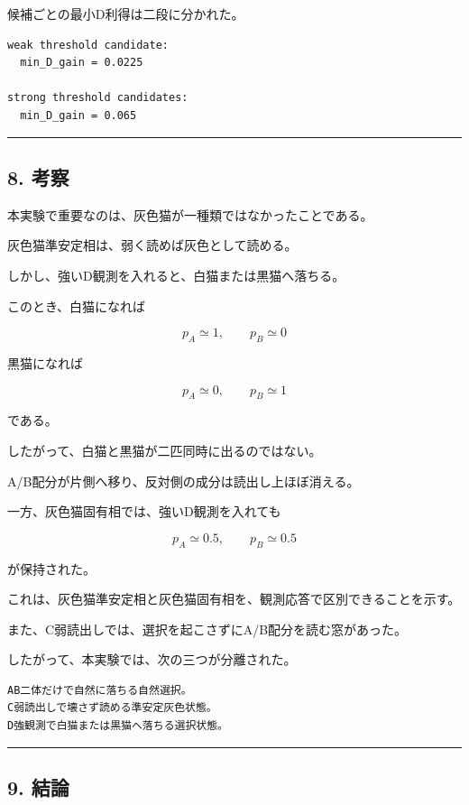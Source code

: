 \documentclass{article}
\begin{document}
候補ごとの最小D利得は二段に分かれた。

\begin{verbatim}
weak threshold candidate:
  min_D_gain = 0.0225

strong threshold candidates:
  min_D_gain = 0.065
\end{verbatim}

\begin{center}\rule{0.5\linewidth}{0.5pt}\end{center}

\subsection{8. 考察}\label{ux8003ux5bdf}

本実験で重要なのは、灰色猫が一種類ではなかったことである。

灰色猫準安定相は、弱く読めば灰色として読める。

しかし、強いD観測を入れると、白猫または黒猫へ落ちる。

このとき、白猫になれば

\[
p_A\simeq 1,\qquad p_B\simeq 0
\]

黒猫になれば

\[
p_A\simeq 0,\qquad p_B\simeq 1
\]

である。

したがって、白猫と黒猫が二匹同時に出るのではない。

A/B配分が片側へ移り、反対側の成分は読出し上ほぼ消える。

一方、灰色猫固有相では、強いD観測を入れても

\[
p_A\simeq 0.5,\qquad p_B\simeq 0.5
\]

が保持された。

これは、灰色猫準安定相と灰色猫固有相を、観測応答で区別できることを示す。

また、C弱読出しでは、選択を起こさずにA/B配分を読む窓があった。

したがって、本実験では、次の三つが分離された。

\begin{verbatim}
AB二体だけで自然に落ちる自然選択。
C弱読出しで壊さず読める準安定灰色状態。
D強観測で白猫または黒猫へ落ちる選択状態。
\end{verbatim}

\begin{center}\rule{0.5\linewidth}{0.5pt}\end{center}

\subsection{9. 結論}\label{ux7d50ux8ad6-1}
\end{document}
